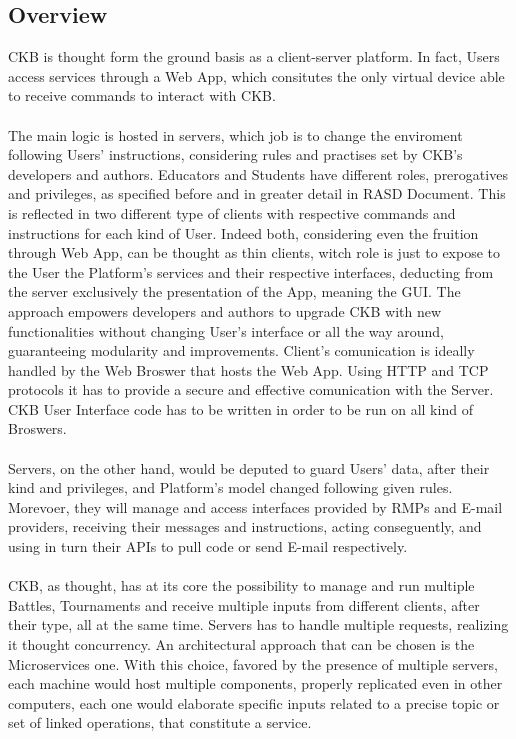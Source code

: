 \subsection{Overview}
CKB is thought form the ground basis as a client-server platform. In fact, Users access services through a Web App, which consitutes the only virtual device able to receive commands to interact with CKB.\\\\
The main logic is hosted in servers, which job is to change the enviroment following Users' instructions, considering rules and practises set by CKB's developers and authors.
Educators and Students have different roles, prerogatives and privileges, as specified before and in greater detail in RASD Document. This is reflected in two different type of clients with respective commands and instructions for each kind of User.
Indeed both, considering even the fruition through Web App, can be thought as thin clients, witch role is just to expose to the User the Platform's services and their respective interfaces, deducting from the server exclusively the presentation of the App, meaning the GUI.
The approach empowers developers and authors to upgrade CKB with new functionalities without changing User's interface or all the way around, guaranteeing modularity and improvements.
Client's comunication is ideally handled by the Web Broswer that hosts the Web App. Using HTTP and TCP protocols it has to provide a secure and effective comunication with the Server. CKB User Interface code has to be written in order to be run on all kind of Broswers.\\\\
Servers, on the other hand, would be deputed to guard Users' data, after their kind and privileges, and Platform's model changed following given rules. Morevoer, they will manage and access interfaces provided by RMPs and E-mail providers, receiving their messages and instructions, acting conseguently, and using in turn their APIs to pull code or send E-mail respectively.\\\\
CKB, as thought, has at its core the possibility to manage and run multiple Battles, Tournaments and receive multiple inputs from different clients, after their type, all at the same time. Servers has to handle multiple requests, realizing it thought concurrency. An architectural approach that can be chosen is the Microservices one. 
With this choice, favored by the presence of multiple servers, each machine would host multiple components, properly replicated even in other computers, each one would elaborate specific inputs related to a precise topic or set of linked operations, that constitute a service.
